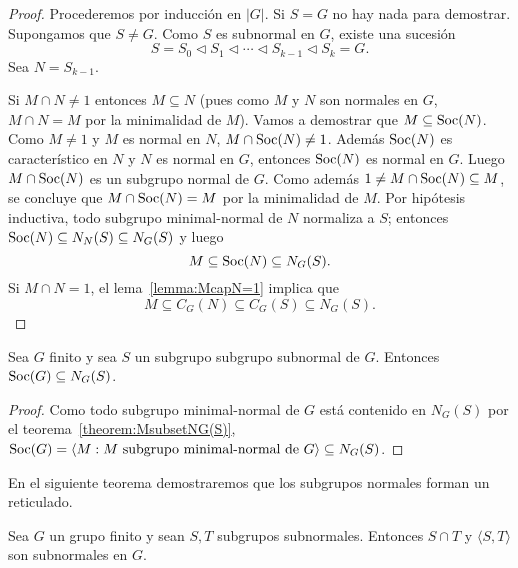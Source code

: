 \begin{proof}
	Procederemos por inducción en $|G|$. Si $S=G$ no hay nada para demostrar.
	Supongamos que $S\ne G$.  Como $S$ es subnormal en $G$, existe una sucesión 
	\[
		S=S_0\triangleleft S_1\triangleleft\cdots\triangleleft S_{k-1}\triangleleft S_k=G.
	\]
	Sea $N=S_{k-1}$. 

	Si $M\cap N\ne 1$ entonces $M\subseteq N$ (pues como $M$ y $N$ son normales
	en $G$, $M\cap N=M$ por la minimalidad de $M$). Vamos a demostrar que
	$M\subseteq\operatorname{Soc}(N)$.  Como $M\ne 1$ y $M$ es normal en $N$,
	$M\cap\operatorname{Soc}(N)\ne 1$. Además $\operatorname{Soc}(N)$ es característico en $N$ y $N$ es
	normal en $G$, entonces $\operatorname{Soc}(N)$ es normal en $G$. Luego $M\cap\operatorname{Soc}(N)$ es
	un subgrupo normal de $G$. Como además $1\ne M\cap\operatorname{Soc}(N)\subseteq M$, se
	concluye que $M\cap\operatorname{Soc}(N)=M$ por la minimalidad de $M$. Por hipótesis inductiva, 
	todo subgrupo minimal-normal de $N$ normaliza a $S$; entonces 
	$\operatorname{Soc}(N)\subseteq N_N(S)\subseteq N_G(S)$ y luego 
	\[
	M\subseteq\operatorname{Soc}(N)\subseteq N_G(S).
	\]
	Si $M\cap N=1$, el lema~\ref{lemma:McapN=1} implica que
	\[
	M\subseteq C_G(N)\subseteq C_G(S)\subseteq N_G(S). 
	\]
\end{proof}

\begin{corollary}
	Sea $G$ finito y sea $S$ un subgrupo subgrupo subnormal de $G$. Entonces
	$\operatorname{Soc}(G)\subseteq N_G(S)$.
\end{corollary}

\begin{proof}
	Como todo subgrupo minimal-normal de $G$ está contenido en $N_G(S)$ por 
	el teorema~\ref{theorem:MsubsetNG(S)}, 
	$\operatorname{Soc}(G)=\langle M:M\text{ subgrupo 
	minimal-normal de $G$}\rangle\subseteq N_G(S)$.
\end{proof}

En el siguiente teorema demostraremos que los subgrupos normales forman un
reticulado.

\begin{theorem}[Wielandt]
	\label{theorem:STsubnormal}
	Sea $G$ un grupo finito y sean $S,T$ subgrupos subnormales. Entonces $S\cap T$ y 
	$\langle S,T\rangle$ son subnormales en $G$.
\end{theorem}

